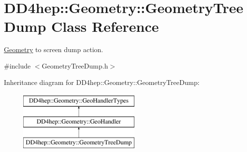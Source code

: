 \hypertarget{class_d_d4hep_1_1_geometry_1_1_geometry_tree_dump}{}\section{D\+D4hep\+:\+:Geometry\+:\+:Geometry\+Tree\+Dump Class Reference}
\label{class_d_d4hep_1_1_geometry_1_1_geometry_tree_dump}


\hyperlink{namespace_d_d4hep_1_1_geometry}{Geometry} to screen dump action.  




{\ttfamily \#include $<$Geometry\+Tree\+Dump.\+h$>$}

Inheritance diagram for D\+D4hep\+:\+:Geometry\+:\+:Geometry\+Tree\+Dump\+:\begin{figure}[H]
\begin{center}
\leavevmode
\includegraphics[height=3.000000cm]{class_d_d4hep_1_1_geometry_1_1_geometry_tree_dump}
\end{center}
\end{figure}
